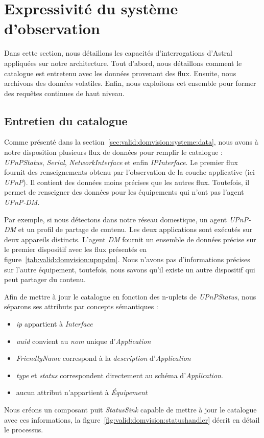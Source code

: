 \section{Expressivité du système d'observation}\label{sec:valid:domvision:requetes}
Dans cette section, nous détaillons les capacités d'interrogations d'Astral appliquées sur notre architecture. Tout d'abord, nous détaillons comment le catalogue est entretenu avec les données provenant des flux. Ensuite, nous archivons des données volatiles. Enfin, nous exploitons cet ensemble pour former des requêtes continues de haut niveau.

\subsection{Entretien du catalogue}
Comme présenté dans la section~\ref{sec:valid:domvision:systeme:data}, nous avons à notre disposition plusieurs flux de données pour remplir le catalogue : \textit{UPnPStatus}, \textit{Serial}, \textit{NetworkInterface} et enfin \textit{IPInterface}. Le premier flux fournit des renseignements obtenu par l'observation de la couche applicative (ici \textit{UPnP}). Il contient des données moins précises que les autres flux. Toutefois, il permet de renseigner des données pour les équipements qui n'ont pas l'agent \textit{UPnP-DM}.

Par exemple, si nous détectons dans notre réseau domestique, un agent \textit{UPnP-DM} et un profil de partage de contenu. Les deux applications sont exécutés sur deux appareils distincts. L'agent \textit{DM} fournit un ensemble de données précise sur le premier dispositif avec les flux présentés en figure~\ref{tab:valid:domvision:upnpdm}. Nous n'avons pas d'informations précises sur l'autre équipement, toutefois, nous savons qu'il existe un autre dispositif qui peut partager du contenu.

Afin de mettre à jour le catalogue en fonction des n-uplets de \textit{UPnPStatus}, nous séparons ses attributs par concepts sémantiques :
\begin{itemize}
\item \textit{ip} appartient à \textit{Interface}
\item \textit{uuid} convient au \textit{nom} unique d'\textit{Application}
\item \textit{FriendlyName} correspond à la \textit{description} d'\textit{Application}
\item \textit{type} et \textit{status} correspondent directement au schéma d'\textit{Application}.
\item aucun attribut n'appartient à \textit{Équipement}
\end{itemize}
Nous créons un composant puit \textit{StatusSink} capable de mettre à jour le catalogue avec ces informations, la figure~\ref{fig:valid:domvision:statushandler} décrit en détail le processus.

